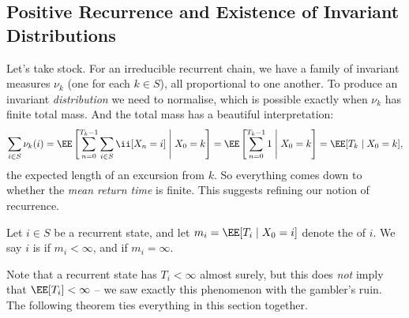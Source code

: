\subsection{Positive Recurrence and Existence of Invariant Distributions}

Let's take stock. For an irreducible recurrent chain, we have a family of invariant measures $\nu_k$ (one for each $k \in S$), all proportional to one another. To produce an invariant \emph{distribution} we need to normalise, which is possible exactly when $\nu_k$ has finite total mass. And the total mass has a beautiful interpretation:
$$
\sum_{i \in S} \nu_k(i) = \EE\left[\sum_{n = 0}^{T_k - 1} \sum_{i \in S}\ii[X_n = i] \;\middle|\; X_0 = k\right] = \EE\left[\sum_{n = 0}^{T_k - 1} 1 \;\middle|\; X_0 = k\right] = \EE[T_k \mid X_0 = k],
$$
the expected length of an excursion from $k$. So everything comes down to whether the \emph{mean return time} is finite. This suggests refining our notion of recurrence.

\begin{definition}
	Let $i \in S$ be a recurrent state, and let $m_i = \EE[T_i \mid X_0 = i]$ denote the  of $i$. We say $i$ is  if $m_i < \infty$, and  if $m_i = \infty$.
\end{definition}

Note that a recurrent state has $T_i < \infty$ almost surely, but this does \emph{not} imply that $\EE[T_i] < \infty$ -- we saw exactly this phenomenon with the gambler's ruin. The following theorem ties everything in this section together.

